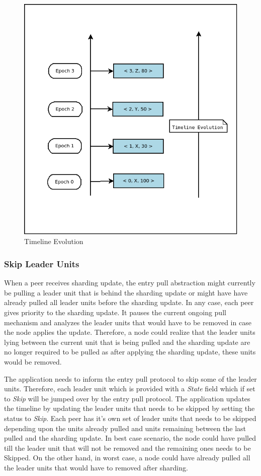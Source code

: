 \documentclass[a4paper,11pt]{kth-mag}
\begin{document}
\begin{figure}
	\includegraphics[scale=0.5]{timeline_new}
	\centering
	\caption{Timeline Evolution}
	\label{fig:timeline}
\end{figure}


\subsubsection{Skip Leader Units}

When a peer receives sharding update, the entry pull abstraction might currently be pulling a leader unit that is behind the sharding update or might have have already pulled all leader units before the sharding update. In any case, each peer gives priority to the sharding update. It pauses the current ongoing pull mechanism and analyzes the leader units that would have to be removed in case the node applies the update. Therefore, a node could realize that the leader units lying between the current unit that is being pulled and the sharding update are no longer required to be pulled as after applying the sharding update, these units would be removed.
\par The application needs to inform the entry pull protocol to skip some of the leader units. Therefore, each leader unit which is provided with a \textit{State} field which if set to \textit{Skip} will be jumped over by the entry pull protocol. The application updates the timeline by updating the leader units that needs to be skipped by setting the status to \textit{Skip}. Each peer has it's own set of leader units that needs to be skipped depending upon the units already pulled and units remaining between the last pulled and the sharding update. In best case scenario, the node could have pulled till the leader unit that will not be removed and the remaining ones needs to be Skipped. On the other hand, in worst case, a node could have already pulled all the leader units that would have to removed after sharding.
\end{document}
